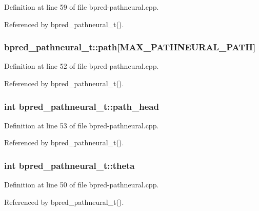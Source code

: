 Definition at line 59 of file bpred-pathneural.cpp.

Referenced by bpred\_\-pathneural\_\-t().
\subsubsection[{path}]{ {\bf bpred\_\-pathneural\_\-t::path}[MAX\_\-PATHNEURAL\_\-PATH]\hspace{0.3cm}{\tt  [protected]}}\label{classbpred__pathneural__t_3b3ab0c9f141e3e7440e6203d8f308c5}




Definition at line 52 of file bpred-pathneural.cpp.

Referenced by bpred\_\-pathneural\_\-t().
\subsubsection[{path\_\-head}]{\setlength{\rightskip}{0pt plus 5cm}int {\bf bpred\_\-pathneural\_\-t::path\_\-head}\hspace{0.3cm}{\tt  [protected]}}\label{classbpred__pathneural__t_56982d25bb3fe236f0d2237cf52ca42d}




Definition at line 53 of file bpred-pathneural.cpp.

Referenced by bpred\_\-pathneural\_\-t().
\subsubsection[{theta}]{\setlength{\rightskip}{0pt plus 5cm}int {\bf bpred\_\-pathneural\_\-t::theta}\hspace{0.3cm}{\tt  [protected]}}\label{classbpred__pathneural__t_24050a269eb36a524ed559bf7249e2de}




Definition at line 50 of file bpred-pathneural.cpp.

Referenced by bpred\_\-pathneural\_\-t().
